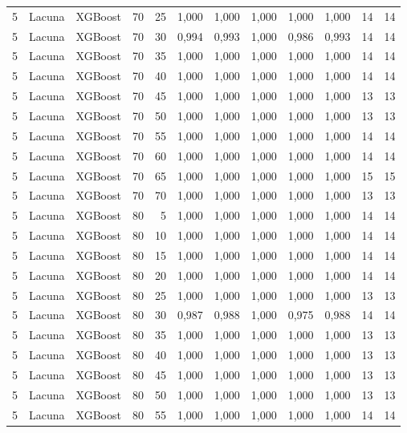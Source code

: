 \begin{longtable}{@{}rllrrrrrrrrr@{}}
5 & Lacuna & XGBoost & 70 & 25 & 1,000 & 1,000 & 1,000 & 1,000 & 1,000 & 14 & 14 \\
5 & Lacuna & XGBoost & 70 & 30 & 0,994 & 0,993 & 1,000 & 0,986 & 0,993 & 14 & 14 \\
5 & Lacuna & XGBoost & 70 & 35 & 1,000 & 1,000 & 1,000 & 1,000 & 1,000 & 14 & 14 \\
5 & Lacuna & XGBoost & 70 & 40 & 1,000 & 1,000 & 1,000 & 1,000 & 1,000 & 14 & 14 \\
5 & Lacuna & XGBoost & 70 & 45 & 1,000 & 1,000 & 1,000 & 1,000 & 1,000 & 13 & 13 \\
5 & Lacuna & XGBoost & 70 & 50 & 1,000 & 1,000 & 1,000 & 1,000 & 1,000 & 13 & 13 \\
5 & Lacuna & XGBoost & 70 & 55 & 1,000 & 1,000 & 1,000 & 1,000 & 1,000 & 14 & 14 \\
5 & Lacuna & XGBoost & 70 & 60 & 1,000 & 1,000 & 1,000 & 1,000 & 1,000 & 14 & 14 \\
5 & Lacuna & XGBoost & 70 & 65 & 1,000 & 1,000 & 1,000 & 1,000 & 1,000 & 15 & 15 \\
5 & Lacuna & XGBoost & 70 & 70 & 1,000 & 1,000 & 1,000 & 1,000 & 1,000 & 13 & 13 \\
5 & Lacuna & XGBoost & 80 & 5 & 1,000 & 1,000 & 1,000 & 1,000 & 1,000 & 14 & 14 \\
5 & Lacuna & XGBoost & 80 & 10 & 1,000 & 1,000 & 1,000 & 1,000 & 1,000 & 14 & 14 \\
5 & Lacuna & XGBoost & 80 & 15 & 1,000 & 1,000 & 1,000 & 1,000 & 1,000 & 14 & 14 \\
5 & Lacuna & XGBoost & 80 & 20 & 1,000 & 1,000 & 1,000 & 1,000 & 1,000 & 14 & 14 \\
5 & Lacuna & XGBoost & 80 & 25 & 1,000 & 1,000 & 1,000 & 1,000 & 1,000 & 13 & 13 \\
5 & Lacuna & XGBoost & 80 & 30 & 0,987 & 0,988 & 1,000 & 0,975 & 0,988 & 14 & 14 \\
5 & Lacuna & XGBoost & 80 & 35 & 1,000 & 1,000 & 1,000 & 1,000 & 1,000 & 13 & 13 \\
5 & Lacuna & XGBoost & 80 & 40 & 1,000 & 1,000 & 1,000 & 1,000 & 1,000 & 13 & 13 \\
5 & Lacuna & XGBoost & 80 & 45 & 1,000 & 1,000 & 1,000 & 1,000 & 1,000 & 13 & 13 \\
5 & Lacuna & XGBoost & 80 & 50 & 1,000 & 1,000 & 1,000 & 1,000 & 1,000 & 13 & 13 \\
5 & Lacuna & XGBoost & 80 & 55 & 1,000 & 1,000 & 1,000 & 1,000 & 1,000 & 14 & 14 \\

\end{longtable}
